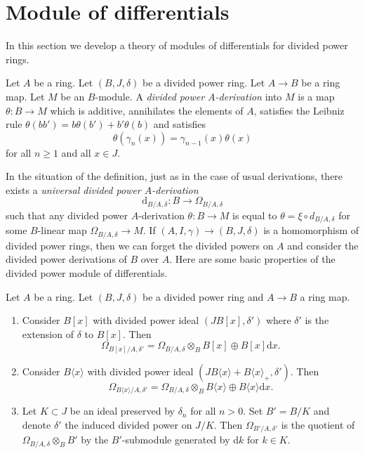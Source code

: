 \section{Module of differentials}
\label{section-differentials}

\noindent
In this section we develop a theory of modules of differentials
for divided power rings.

\begin{definition}
\label{definition-derivation}
Let $A$ be a ring. Let $(B, J, \delta)$ be a divided power ring.
Let $A \to B$ be a ring map. Let $M$ be an $B$-module.
A {\it divided power $A$-derivation} into $M$ is a map
$\theta : B \to M$ which is additive, annihilates the elements
of $A$, satisfies the Leibniz rule
$\theta(bb') = b\theta(b') + b'\theta(b)$ and satisfies
$$
\theta(\gamma_n(x)) = \gamma_{n - 1}(x)\theta(x)
$$
for all $n \geq 1$ and all $x \in J$.
\end{definition}

\noindent
In the situation of the definition, just as in the case of usual
derivations, there exists a {\it universal divided power $A$-derivation}
$$
\text{d}_{B/A, \delta} : B \to \Omega_{B/A, \delta}
$$
such that any divided power $A$-derivation $\theta : B \to M$ is equal to
$\theta = \xi \circ d_{B/A, \delta}$ for some $B$-linear map
$\Omega_{B/A, \delta} \to M$. If $(A, I, \gamma) \to (B, J, \delta)$
is a homomorphism of divided power rings, then we can forget the
divided powers on $A$ and consider the divided power derivations of
$B$ over $A$. Here are some basic properties of the divided power
module of differentials.

\begin{lemma}
\label{lemma-omega}
Let $A$ be a ring. Let $(B, J, \delta)$ be a divided power ring and
$A \to B$ a ring map. 
\begin{enumerate}
\item Consider $B[x]$ with divided power ideal $(JB[x], \delta')$
where $\delta'$ is the extension of $\delta$ to $B[x]$. Then
$$
\Omega_{B[x]/A, \delta'} =
\Omega_{B/A, \delta} \otimes_B B[x] \oplus B[x]\text{d}x.
$$
\item Consider $B\langle x \rangle$ with divided power ideal
$(JB\langle x \rangle + B\langle x \rangle_{+}, \delta')$. Then
$$
\Omega_{B\langle x\rangle/A, \delta'} =
\Omega_{B/A, \delta} \otimes_B B\langle x \rangle \oplus
B\langle x\rangle \text{d}x.
$$
\item Let $K \subset J$ be an ideal preserved by $\delta_n$ for
all $n > 0$. Set $B' = B/K$ and denote $\delta'$ the induced
divided power on $J/K$. Then $\Omega_{B'/A, \delta'}$ is the quotient
of $\Omega_{B/A, \delta} \otimes_B B'$ by the $B'$-submodule generated
by $\text{d}k$ for $k \in K$.
\end{enumerate}
\end{lemma}

